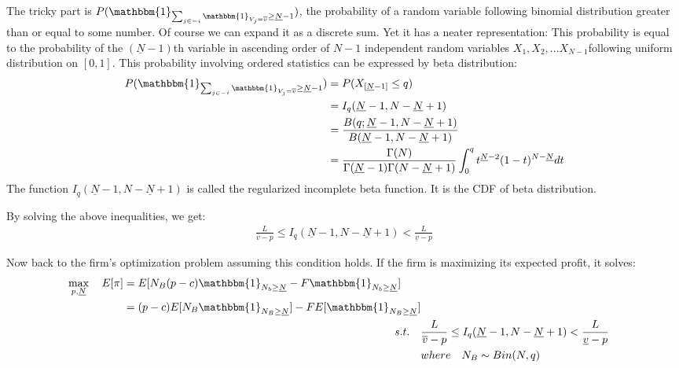 \documentclass{article}
\begin{document}
The tricky part is
$P(\mathbbm{1}_{\sum_{j \in -i} \mathbbm{1}_{V_j = \overline{v}} \geq \underline{N} - 1})$,
the probability of a random variable following binomial distribution
greater than or equal to some number. Of course we can expand
it as a discrete sum. Yet it has a neater representation:
This probability is equal to the probability of the
$(\underline{N}-1)$th variable in ascending order of $N-1$ independent
random variables $X_1, X_2, \dots X_{N-1}$following uniform distribution on $[0,1]$.
This probability involving ordered statistics can be expressed
by beta distribution:
\begin{align*}
    P(\mathbbm{1}_{\sum_{j \in -i} \mathbbm{1}_{V_j = \overline{v}} \geq \underline{N} - 1})
    &= P(X_{[\underline{N}-1]} \leq q) \\
    &= I_q(\underline{N}-1, N - \underline{N} + 1) \\
    &= \frac{B(q;\underline{N}-1, N - \underline{N} + 1)}{B(\underline{N}-1, N - \underline{N} + 1)}\\
    &= \frac{\Gamma(N)}{\Gamma(\underline{N}-1)\Gamma(N - \underline{N} + 1)}
    \int_0^q t^{\underline{N}-2}(1-t)^{N - \underline{N}}dt
\end{align*}
The function $I_q(\underline{N}-1, N - \underline{N} + 1)$ is called
the regularized incomplete beta function. It is the CDF of
beta distribution.


By solving the above inequalities, we get:
\begin{align}
    \frac{L}{\overline{v} - p} \leq
    I_q(\underline{N}-1, N - \underline{N} + 1) <
    \frac{L}{\underline{v} - p}
\end{align}

Now back to the firm's optimization problem assuming this
condition holds. If the firm is maximizing its expected
profit, it solves:
\begin{align}
    \begin{split}
    \max_{p,\underline{N}} \quad E[\pi] &=
    E[N_B (p-c) \mathbbm{1}_{N_b \geq \underline{N}} -
    F\mathbbm{1}_{N_b \geq \underline{N}}] \\
    &= (p-c)E[N_B \mathbbm{1}_{N_B \geq \underline{N}}] -
    FE[\mathbbm{1}_{N_B \geq \underline{N}}] \\
    \end{split}\\
    s.t. \quad & \frac{L}{\overline{v} - p} \leq
    I_q(\underline{N}-1, N - \underline{N} + 1) <
    \frac{L}{\underline{v} - p}\\
    & where \quad N_B \sim Bin(N,q)
\end{align}
\end{document}
